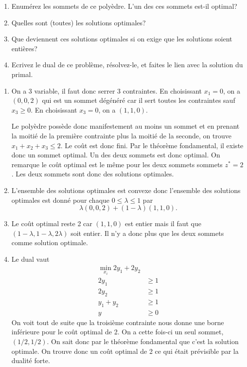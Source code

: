 \begin{enumerate}
    \begin{enumerate}
      \item Enumérez les sommets de ce polyèdre. L'un des
        ces sommets est-il optimal?
      \item Quelles sont (toutes) les
        solutions optimales?
      \item Que deviennent ces solutions optimales si
        on exige que les solutions soient entières?
      \item Ecrivez le dual de
        ce problème, résolvez-le, et faites le lien avec la solution du
        primal.
    \end{enumerate}

    \begin{solution}
      \begin{enumerate}
        \item On a 3 variable, il faut donc serrer 3 contraintes.
          En choisissant $x_1 = 0$, on a $(0, 0, 2)$ qui est un sommet
          dégénéré car il sert toutes les contraintes sauf $x_3 \geq 0$.
          En choisissant $x_3 = 0$, on a $(1, 1, 0)$.

          Le polyèdre possède donc manifestement au moins un sommet et
          en prenant la moitié de la première contrainte plus la moitié
          de la seconde, on trouve $x_1 + x_2 + x_3 \leq 2$.
          Le coût est donc fini.
          Par le théorème fondamental, il existe donc un sommet optimal.
          Un des deux sommets est donc optimal.
          On remarque le coût optimal est le même pour les deux sommets
          sommets $z^* = 2$.
          Les deux sommets sont donc des solutions optimales.
        \item L'ensemble des solutions optimales est convexe donc
          l'ensemble des solutions optimales est donné pour chaque
          $0 \leq \lambda \leq 1$ par
          \[ \lambda(0,0,2) + (1-\lambda)(1,1,0). \]
        \item Le coût optimal reste 2 car $(1,1,0)$ est entier mais il faut
          que $(1-\lambda,1-\lambda,2\lambda)$ soit entier.
          Il n'y a donc plus que les deux sommets comme solution optimale.
        \item Le dual vaut
          \begin{align*}
            \min_{x_i}  2y_1 + 2y_2\\
            2y_1 & \geq 1\\
            2y_2 & \geq 1\\
            y_1 + y_2 & \geq 1\\
            y & \geq 0
          \end{align*}
          On voit tout de suite que la troisième contrainte nous donne
          une borne inférieure pour le coût optimal de 2.
          On a cette fois-ci un seul sommet, $(1/2,1/2)$.
          On sait donc par le théorème fondamental que c'est la solution
          optimale.
          On trouve donc un coût optimal de 2 ce qui était prévisible
          par la dualité forte.


\end{enumerate}
\end{solution}
\end{enumerate}
